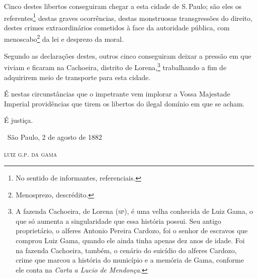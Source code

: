 Cinco destes libertos conseguiram chegar a esta cidade de S.\,Paulo; são
eles os referentes\footnote{No sentido de informantes, referenciais.}
destas graves ocorrências, destas monstruosas transgressões do direito,
destes crimes extraordinários cometidos à face da autoridade pública,
com menoscabo\footnote{Menosprezo, descrédito.} da lei e desprezo da
moral.

Segundo as declarações destes, outros cinco conseguiram deixar a pressão
em que viviam e ficaram na Cachoeira, distrito de Lorena,\footnote{A
  fazenda Cachoeira, de Lorena (\textsc{sp}), é uma velha conhecida de Luiz Gama,
  o que só aumenta a singularidade que essa história possui. Seu antigo
  proprietário, o alferes Antonio Pereira Cardozo, foi o senhor de
  escravos que comprou Luiz Gama, quando ele ainda tinha apenas dez anos
  de idade. Foi na fazenda Cachoeira, também, o cenário do suicídio do
  alferes Cardozo, crime que marcou a história do município e a memória
  de Gama, conforme ele conta na \emph{Carta a Lucio de Mendonça}.}
trabalhando a fim de
adquirirem meio de transporte para esta cidade.

É nestas circunstâncias que o impetrante vem implorar a Vossa Majestade
Imperial providências que tirem os libertos do ilegal domínio em que se
acham.

É justiça.

\bigskip

\hfill\ São Paulo, 2 de agosto de 1882

\hfill\textsc{luiz g.p. da gama}

\asterisc
